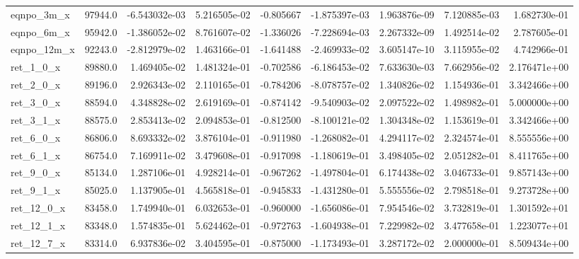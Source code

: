 \documentclass[10pt]{article}
\begin{document}
\begin{landscape}
\begin{longtable}{lrrrrrrrr}
eqnpo\_3m\_x              &   97944.0 & -6.543032e-03 &  5.216505e-02 &     -0.805667 & -1.875397e-03 &  1.963876e-09 &  7.120885e-03 &  1.682730e-01 \\
eqnpo\_6m\_x              &   95942.0 & -1.386052e-02 &  8.761607e-02 &     -1.336026 & -7.228694e-03 &  2.267332e-09 &  1.492514e-02 &  2.787605e-01 \\
eqnpo\_12m\_x             &   92243.0 & -2.812979e-02 &  1.463166e-01 &     -1.641488 & -2.469933e-02 &  3.605147e-10 &  3.115955e-02 &  4.742966e-01 \\
ret\_1\_0\_x               &   89880.0 &  1.469405e-02 &  1.481324e-01 &     -0.702586 & -6.186453e-02 &  7.633630e-03 &  7.662956e-02 &  2.176471e+00 \\
ret\_2\_0\_x               &   89196.0 &  2.926343e-02 &  2.110165e-01 &     -0.784206 & -8.078757e-02 &  1.340826e-02 &  1.154936e-01 &  3.342466e+00 \\
ret\_3\_0\_x               &   88594.0 &  4.348828e-02 &  2.619169e-01 &     -0.874142 & -9.540903e-02 &  2.097522e-02 &  1.498982e-01 &  5.000000e+00 \\
ret\_3\_1\_x               &   88575.0 &  2.853413e-02 &  2.094853e-01 &     -0.812500 & -8.100121e-02 &  1.304348e-02 &  1.153619e-01 &  3.342466e+00 \\
ret\_6\_0\_x               &   86806.0 &  8.693332e-02 &  3.876104e-01 &     -0.911980 & -1.268082e-01 &  4.294117e-02 &  2.324574e-01 &  8.555556e+00 \\
ret\_6\_1\_x               &   86754.0 &  7.169911e-02 &  3.479608e-01 &     -0.917098 & -1.180619e-01 &  3.498405e-02 &  2.051282e-01 &  8.411765e+00 \\
ret\_9\_0\_x               &   85134.0 &  1.287106e-01 &  4.928214e-01 &     -0.967262 & -1.497804e-01 &  6.174438e-02 &  3.046733e-01 &  9.857143e+00 \\
ret\_9\_1\_x               &   85025.0 &  1.137905e-01 &  4.565818e-01 &     -0.945833 & -1.431280e-01 &  5.555556e-02 &  2.798518e-01 &  9.273728e+00 \\
ret\_12\_0\_x              &   83458.0 &  1.749940e-01 &  6.032653e-01 &     -0.960000 & -1.656086e-01 &  7.954546e-02 &  3.732819e-01 &  1.301592e+01 \\
ret\_12\_1\_x              &   83348.0 &  1.574835e-01 &  5.624462e-01 &     -0.972763 & -1.604938e-01 &  7.229982e-02 &  3.477658e-01 &  1.223077e+01 \\
ret\_12\_7\_x              &   83314.0 &  6.937836e-02 &  3.404595e-01 &     -0.875000 & -1.173493e-01 &  3.287172e-02 &  2.000000e-01 &  8.509434e+00 \\

\end{longtable}
\end{landscape}
\end{document}
